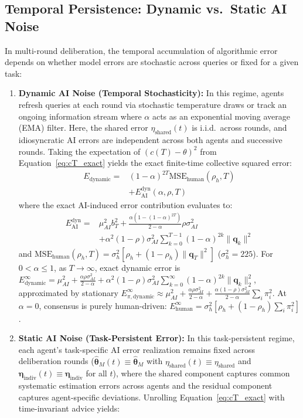 \documentclass
[letterpaper]{article}
\begin{document}
\subsection{Temporal Persistence: Dynamic vs.\ Static AI Noise}
In multi-round deliberation, the temporal accumulation of algorithmic error depends on whether model errors are stochastic across queries or fixed for a given task:
\begin{enumerate}\setlength{\itemsep}{0pt}\setlength{\parskip}{0pt}\setlength{\parsep}{0pt}
    \item \textbf{Dynamic AI Noise (Temporal Stochasticity):} In this regime, agents refresh queries at each round via stochastic temperature draws or track an ongoing information stream where $\alpha$ acts as an exponential moving average (EMA) filter. Here, the shared error $\eta_{\text{shared}}(t)$ is i.i.d.\ across rounds, and idiosyncratic AI errors are independent across both agents and successive rounds. Taking the expectation of $(c(T) - \theta)^2$ from Equation~\ref{eq:cT_exact} yields the exact finite-time collective squared error:
    \begin{align}
    E_{\text{dynamic}} ={}& (1 - \alpha)^{2T} \text{MSE}_{\text{human}}(\rho_h, T) \nonumber \\
    &+ E_{\text{AI}}^{\text{dyn}}(\alpha, \rho, T)
    \label{eq:dynamic_error}
    \end{align}
    where the exact AI-induced error contribution evaluates to:
    \begin{align}
    E_{\text{AI}}^{\text{dyn}} ={}& \mu_{AI}^2 b_T^2 + \frac{\alpha(1 - (1 - \alpha)^{2T})}{2 - \alpha} \rho \sigma_{AI}^2 \nonumber \\
    &+ \alpha^2 (1 - \rho) \sigma_{AI}^2 \sum_{k=0}^{T-1} (1 - \alpha)^{2k} \|\mathbf{q}_k\|^2
    \end{align}
    and $\text{MSE}_{\text{human}}(\rho_h, T) = \sigma_h^2 [\rho_h + (1 - \rho_h)\|\mathbf{q}_T\|^2]$ ($\sigma_h^2 = 225$). For $0 < \alpha \le 1$, as $T \to \infty$, exact dynamic error is $E_{\text{dynamic}}^\infty = \mu_{AI}^2 + \frac{\alpha \rho \sigma_{AI}^2}{2 - \alpha} + \alpha^2 (1 - \rho) \sigma_{AI}^2 \sum_{k=0}^\infty (1 - \alpha)^{2k} \|\mathbf{q}_k\|_2^2$, approximated by stationary $E_{\pi,\text{dynamic}}^\infty \approx \mu_{AI}^2 + \frac{\alpha \rho \sigma_{AI}^2}{2 - \alpha} + \frac{\alpha(1-\rho)\sigma_{AI}^2}{2 - \alpha}\sum_i \pi_i^2$. At $\alpha = 0$, consensus is purely human-driven: $E_{\text{human}}^\infty = \sigma_h^2 [\rho_h + (1 - \rho_h)\sum_i \pi_i^2]$.
    \item \textbf{Static AI Noise (Task-Persistent Error):} In this task-persistent regime, each agent's task-specific AI error realization remains fixed across deliberation rounds ($\hat{\boldsymbol{\theta}}_M(t) \equiv \hat{\boldsymbol{\theta}}_M$ with $\eta_{\text{shared}}(t) \equiv \eta_{\text{shared}}$ and $\boldsymbol{\eta}_{\text{indiv}}(t) \equiv \boldsymbol{\eta}_{\text{indiv}}$ for all $t$), where the shared component captures common systematic estimation errors across agents and the residual component captures agent-specific deviations. Unrolling Equation~\ref{eq:cT_exact} with time-invariant advice yields:

\end{enumerate}
\end{document}
